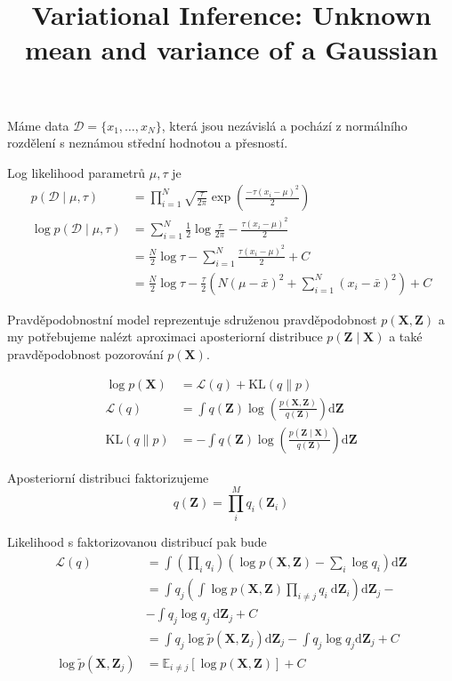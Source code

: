\documentclass[11pt]{article}
\title{Variational Inference: Unknown mean and variance of a Gaussian}
\date{}
\begin{document}
\maketitle

Máme data $\mathcal{D} = \{x_1, \dots, x_N\}$, která jsou nezávislá a pochází z
normálního rozdělení s neznámou střední hodnotou a přesností.

Log likelihood parametrů $\mu, \tau$ je
\begin{align}
p(\mathcal{D} \mid \mu, \tau) &=
    \prod_{i=1}^N \sqrt{\frac{\tau}{2\pi}}
              \exp \left(\frac{-\tau(x_i - \mu)^2}{2}\right)
\\
\log p(\mathcal{D} \mid \mu, \tau) &=
    \sum_{i=1}^N
        \frac{1}{2} \log \frac{\tau}{2\pi} - \frac{\tau(x_i - \mu)^2}{2}
\\
&=
    \frac{N}{2} \log \tau
    - \sum_{i=1}^N \frac{\tau (x_i - \mu)^2}{2}
    + C
\\
&=
    \frac{N}{2} \log \tau
    - \frac{\tau}{2}
    \left(
        N(\mu - \bar x)^2
        + \sum_{i=1}^N (x_i - \bar x)^2
    \right)
    + C
\end{align}

Pravděpodobnostní model reprezentuje sdruženou pravděpodobnost $p(\bm{X},
\bm{Z})$ a my potřebujeme nalézt aproximaci aposteriorní distribuce $p(\bm{Z}
\mid \bm{X})$ a také pravděpodobnost pozorování $p(\bm{X})$.

\begin{align}
\log p(\bm{X}) &=
    \mathcal{L}(q) + \mathrm{KL}(q \| p)
\\
\mathcal{L}(q) &=
    \int q(\bm{Z}) \log
        \left(
            \frac{p(\bm{X}, \bm{Z})}
                 {q(\bm{Z})}
        \right) \mathrm{d}\bm{Z}
\\
\mathrm{KL}(q \| p) &=
    - \int q(\bm{Z}) \log
        \left(
            \frac{p(\bm{Z} \mid \bm{X})}
                 {q(\bm{Z})}
        \right) \mathrm{d}\bm{Z}
\end{align}

Aposteriorní distribuci faktorizujeme
\begin{equation}
q(\bm{Z}) = \prod_i^M q_i(\bm{Z}_i)
\end{equation}

Likelihood s faktorizovanou distribucí pak bude
\begin{align}
\mathcal{L}(q) &=
    \int \left( \prod_i q_i\right)
    \left(
        \log p(\bm{X}, \bm{Z})
        - \sum_i \log q_i
    \right) \mathrm{d}\bm{Z}
\\
&= \int q_j
    \left(
        \int \log p(\bm{X}, \bm{Z})
        \prod_{i \ne j} q_i ~
            \mathrm{d}\bm{Z}_i
    \right) \mathrm{d}\bm{Z}_j -
\\
&- \int q_j \log q_j ~ \mathrm{d}\bm{Z}_j + C
\\
&= \int q_j
    \log \tilde{p}(\bm{X}, \bm{Z}_j)
    \mathrm{d}\bm{Z}_j -
    \int q_j \log q_j \mathrm{d}\bm{Z}_j
    + C \label{eq:lkl}
\\
\log \tilde{p}(\bm{X}, \bm{Z}_j) &= 
    \mathbb{E}_{i \ne j} [ \log p(\bm{X}, \bm{Z})] + C
\end{align}
\end{document}
